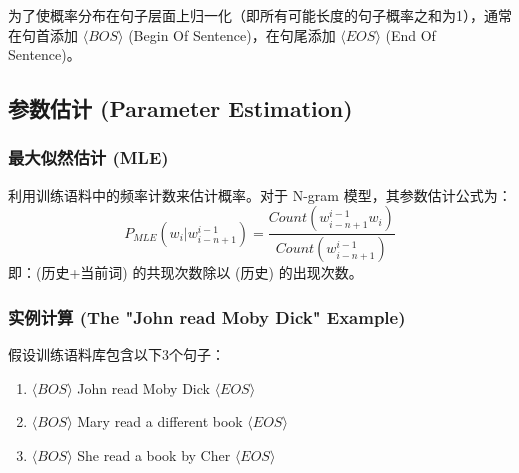 \documentclass[a4paper, 11pt]{ctexart}
\begin{document}
\begin{note}
为了使概率分布在句子层面上归一化（即所有可能长度的句子概率之和为1），通常在句首添加 $\langle BOS \rangle$ (Begin Of Sentence)，在句尾添加 $\langle EOS \rangle$ (End Of Sentence)。
\end{note}

\subsection{参数估计 (Parameter Estimation)}

\subsubsection{最大似然估计 (MLE)}
利用训练语料中的频率计数来估计概率。对于 N-gram 模型，其参数估计公式为：
\begin{equation}
    P_{MLE}(w_i | w_{i-n+1}^{i-1}) = \frac{Count(w_{i-n+1}^{i-1} w_i)}{Count(w_{i-n+1}^{i-1})}
\end{equation}
即：(历史+当前词) 的共现次数除以 (历史) 的出现次数。

\subsubsection{实例计算 (The "John read Moby Dick" Example)}
假设训练语料库包含以下3个句子：
\begin{enumerate}
    \item $\langle BOS \rangle$ John read Moby Dick $\langle EOS \rangle$
    \item $\langle BOS \rangle$ Mary read a different book $\langle EOS \rangle$
    \item $\langle BOS \rangle$ She read a book by Cher $\langle EOS \rangle$
\end{enumerate}
\end{document}
